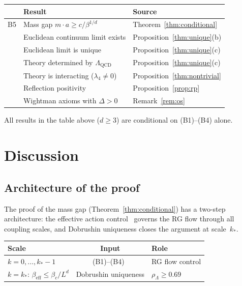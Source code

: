 \documentclass[11pt,a4paper]{article}
\theoremstyle{plain}
\theoremstyle{definition}
\theoremstyle{remark}
\begin{document}
\begin{center}
\renewcommand{\arraystretch}{1.3}
\begin{tabular}{@{}cll@{}}
\toprule
& \textbf{Result} & \textbf{Source} \\
\midrule
B5 & Mass gap $m \cdot a \geq c/\beta^{1/d}$
  & Theorem~\ref{thm:conditional} \\
& Euclidean continuum limit exists
  & Proposition~\ref{thm:unique}(b) \\
& Euclidean limit is unique
  & Proposition~\ref{thm:unique}(c) \\
& Theory determined by $\Lambda_{\mathrm{QCD}}$
  & Proposition~\ref{thm:unique}(c) \\
& Theory is interacting ($\lambda_4 \neq 0$)
  & Proposition~\ref{thm:nontrivial} \\
& Reflection positivity
  & Proposition~\ref{prop:rp} \\
& Wightman axioms with $\Delta > 0$
  & Remark~\ref{rem:os} \\
\bottomrule
\end{tabular}
\end{center}

\noindent
All results in the table above ($d \geq 3$) are conditional
on (B1)--(B4) \cite{FontesSU2} alone.


\section{Discussion}\label{sec:discussion}

\subsection{Architecture of the proof}

The proof of the mass gap
(Theorem~\ref{thm:conditional}) has a two-step
architecture: the effective action control~\cite{FontesSU2}
governs the RG flow
through all coupling scales, and Dobrushin uniqueness closes
the argument at scale~$k_*$.

\begin{center}
\renewcommand{\arraystretch}{1.2}
\begin{tabular}{@{}lcl@{}}
\toprule
\textbf{Scale} & \textbf{Input} &
\textbf{Role} \\ \midrule
$k = 0, \ldots, k_*-1$
  & (B1)--(B4)~\cite{FontesSU2} & RG flow control \\
$k = k_*$: $\beta_{\mathrm{eff}} \leq \beta_c/L^d$
  & Dobrushin uniqueness & $\rho_\Lambda \geq 0.69$ \\
\bottomrule
\end{tabular}
\end{center}
\end{document}
